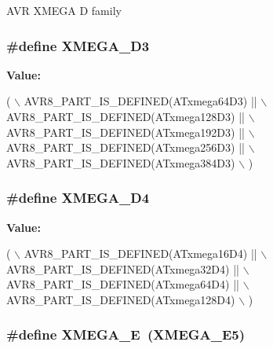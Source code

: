 A\-V\-R X\-M\-E\-G\-A D family \hypertarget{group__xmega__part__macros__group_gad634208a506f79622c67be500014feb3}{
\subsubsection[{X\-M\-E\-G\-A\-\_\-\-D3}]{\setlength{\rightskip}{0pt plus 5cm}\#define X\-M\-E\-G\-A\-\_\-\-D3}}\label{group__xmega__part__macros__group_gad634208a506f79622c67be500014feb3}
{\bfseries Value\-:}
\begin{DoxyCode}
( \(\backslash\)
        AVR8\_PART\_IS\_DEFINED(ATxmega64D3)  || \(\backslash\)
        AVR8\_PART\_IS\_DEFINED(ATxmega128D3) || \(\backslash\)
        AVR8\_PART\_IS\_DEFINED(ATxmega192D3) || \(\backslash\)
        AVR8\_PART\_IS\_DEFINED(ATxmega256D3) || \(\backslash\)
        AVR8\_PART\_IS\_DEFINED(ATxmega384D3) \(\backslash\)
        )
\end{DoxyCode}
\hypertarget{group__xmega__part__macros__group_ga831e633408c7458a445d333b9b3f142f}{
\subsubsection[{X\-M\-E\-G\-A\-\_\-\-D4}]{\setlength{\rightskip}{0pt plus 5cm}\#define X\-M\-E\-G\-A\-\_\-\-D4}}\label{group__xmega__part__macros__group_ga831e633408c7458a445d333b9b3f142f}
{\bfseries Value\-:}
\begin{DoxyCode}
( \(\backslash\)
        AVR8\_PART\_IS\_DEFINED(ATxmega16D4)  || \(\backslash\)
        AVR8\_PART\_IS\_DEFINED(ATxmega32D4)  || \(\backslash\)
        AVR8\_PART\_IS\_DEFINED(ATxmega64D4)  || \(\backslash\)
        AVR8\_PART\_IS\_DEFINED(ATxmega128D4) \(\backslash\)
        )
\end{DoxyCode}
\hypertarget{group__xmega__part__macros__group_gaab6d2543c5128fca0b1aeecb5c080723}{
\subsubsection[{X\-M\-E\-G\-A\-\_\-\-E}]{\setlength{\rightskip}{0pt plus 5cm}\#define X\-M\-E\-G\-A\-\_\-\-E~({\bf X\-M\-E\-G\-A\-\_\-\-E5})}}\label{group__xmega__part__macros__group_gaab6d2543c5128fca0b1aeecb5c080723}
